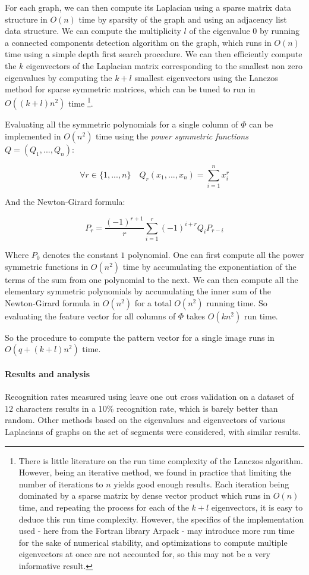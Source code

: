 For each graph, we can then compute its Laplacian using a sparse matrix data structure in $O(n)$ time by sparsity of the graph and using an adjacency list data structure. We can compute the multiplicity $l$ of the eigenvalue $0$ by running a connected components detection algorithm on the graph, which runs in $O(n)$ time using a simple depth first search procedure. We can then efficiently compute the $k$ eigenvectors of the Laplacian matrix corresponding to the smallest non zero eigenvalues by computing the $k + l$ smallest eigenvectors using the Lanczos method for sparse symmetric matrices, which can be tuned to run in $O((k + l)n^2)$ time \footnote{
There is little literature on the run time complexity of the Lanczos algorithm. However, being an iterative method, we found in practice that limiting the number of iterations to $n$ yields good enough results. Each iteration being dominated by a sparse matrix by dense vector product which runs in $O(n)$ time, and repeating the process for each of the $k + l$ eigenvectors, it is easy to deduce this run time complexity. However, the specifics of the implementation used - here from the Fortran library Arpack - may introduce more run time for the sake of numerical stability, and optimizations to compute multiple eigenvectors at once are not accounted for, so this may not be a very informative result.
}.

Evaluating all the symmetric polynomials for a single column of $\Phi$ can be implemented in $O(n^2)$ time using the \emph{power symmetric functions} $Q = (Q_1, ..., Q_n)$:

\[
\forall r \in \{1, ..., n\} \quad Q_r(x_1, ..., x_n) = \sum_{i = 1}^n x_i^r
\]

And the Newton-Girard formula:

\[
P_r = \frac{(-1)^{r+1}}{r} \sum_{i = 1}^r (-1)^{i + r}Q_iP_{r - i}
\]


Where $P_0$ denotes the constant $1$ polynomial. One can first compute all the power symmetric functions in $O(n^2)$ time by accumulating the exponentiation of the terms of the sum from one polynomial to the next. We can then compute all the elementary symmetric polynomials by accumulating the inner sum of the Newton-Girard formula in $O(n^2)$ for a total $O(n^2)$ running time. So evaluating the feature vector for all columns of $\Phi$ takes $O(kn^2)$ run time.

So the procedure to compute the pattern vector for a single image runs in $O(q + (k + l)n^2)$ time.

\paragraph{Results and analysis}
Recognition rates measured using leave one out cross validation on a dataset of $12$ characters results in a $10\%$ recognition rate, which is barely better than random. Other methods based on the eigenvalues and eigenvectors of various Laplacians of graphs on the set of segments were considered, with similar results.

